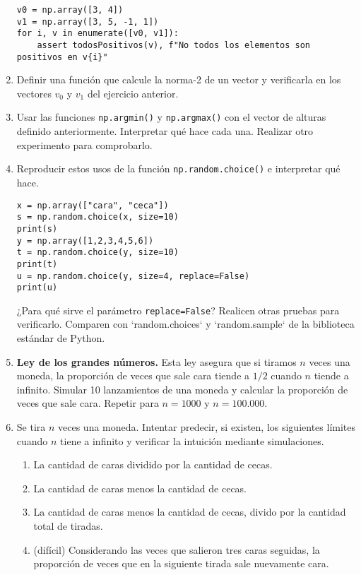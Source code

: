 \documentclass[a4paper,11pt]{article}
\theoremstyle{definition}
\begin{document}
\begin{enumerate}[resume]
\begin{lstlisting}
v0 = np.array([3, 4])
v1 = np.array([3, 5, -1, 1])
for i, v in enumerate([v0, v1]):
    assert todosPositivos(v), f"No todos los elementos son positivos en v{i}"
\end{lstlisting}

\item Definir una función que calcule la norma-2 de un vector y verificarla en los vectores $v_0$ y $v_1$ del ejercicio anterior.

\item Usar las funciones \lstinline{np.argmin()} y \lstinline{np.argmax()} con el vector de alturas definido anteriormente. Interpretar qué hace cada una. Realizar otro experimento para comprobarlo.

\item Reproducir estos usos de la función \lstinline{np.random.choice()} e interpretar qué hace.
\begin{lstlisting}
x = np.array(["cara", "ceca"])
s = np.random.choice(x, size=10)
print(s)
y = np.array([1,2,3,4,5,6])
t = np.random.choice(y, size=10)
print(t)
u = np.random.choice(y, size=4, replace=False)
print(u)
\end{lstlisting}

¿Para qué sirve el parámetro \lstinline{replace=False}? Realicen otras pruebas para verificarlo. Comparen con `random.choices` y `random.sample` de la biblioteca estándar de Python.

\item {\textbf{Ley de los grandes números.}} Esta ley asegura que si tiramos $n$ veces una moneda, la proporción de veces que sale cara tiende a $1/2$ cuando $n$ tiende a infinito.
Simular 10 lanzamientos de una moneda y calcular la proporción de veces que sale cara. Repetir para $n = 1000$ y $n = 100.000$.


\item Se tira $n$ veces una moneda. Intentar predecir, si existen, los siguientes límites cuando $n$ tiene a infinito y verificar la intuición mediante simulaciones.

\begin{enumerate}
\item La cantidad de caras dividido por la cantidad de cecas.
\item La cantidad de caras menos la cantidad de cecas.
\item La cantidad de caras menos la cantidad de cecas, divido por la cantidad total de tiradas.
\item (difícil) Considerando las veces que salieron tres caras seguidas, la proporción de veces que en la siguiente tirada sale nuevamente cara.
\end{enumerate}


\end{enumerate}
\end{document}
